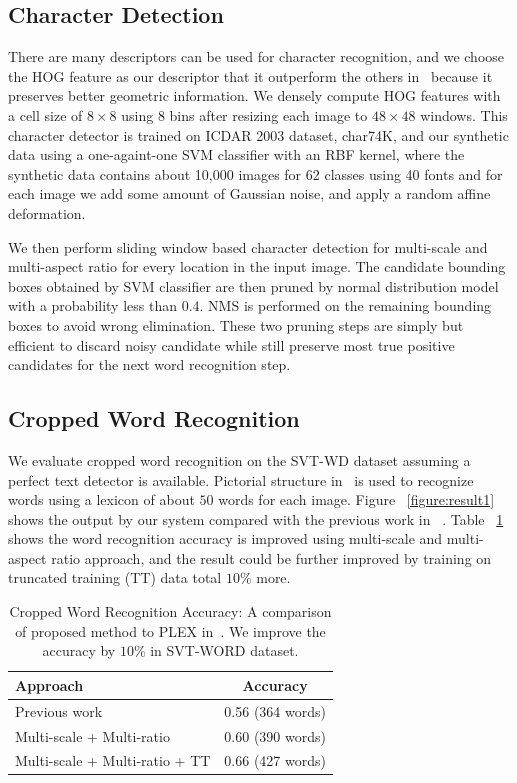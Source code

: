 \documentclass[10pt,twocolumn,letterpaper]{article}
\begin{document}
\subsection{Character Detection}

There are many descriptors can be used for character recognition, and we choose the HOG feature as our descriptor that it outperform the others in~\cite{117} because it preserves better geometric information. We densely compute HOG features with a cell size of $8 \times 8$ using $8$ bins after resizing each image to $48 \times 48$ windows. This character detector is trained on ICDAR 2003 dataset, char74K, and our synthetic data using a one-againt-one SVM classifier with an RBF kernel, where the synthetic data contains about 10,000 images for 62 classes using 40 fonts and for each image we add some amount of Gaussian noise, and apply a random affine deformation.

We then perform sliding window based character detection for multi-scale and multi-aspect ratio for every location in the input image. The candidate bounding boxes obtained by SVM classifier are then pruned by normal distribution model with a probability less than $0.4$. NMS is performed on the remaining bounding boxes to avoid wrong elimination. These two pruning steps are simply but efficient to discard noisy candidate while still preserve most true positive candidates for the next word recognition step.

\subsection{Cropped Word Recognition}

We evaluate cropped word recognition on the SVT-WD dataset assuming a perfect text detector is available. Pictorial structure in~\cite{417} is used to recognize words using a lexicon of about $50$ words for each image. Figure ~\ref{figure:result1} shows the output by our system compared with the previous work in ~\cite{417}. Table ~\ref{table:compare} shows the word recognition accuracy is improved using multi-scale and multi-aspect ratio approach, and the result could be further improved by training on truncated training (TT) data total $10\%$ more.

\begin{table}
\begin{center}
\begin{tabular}{|l|c|}
\hline
Approach & Accuracy \\
\hline\hline
Previous work~\cite{417}  & 0.56 (364 words) \\
Multi-scale + Multi-ratio & 0.60 (390 words)\\
Multi-scale + Multi-ratio + TT & 0.66 (427 words)\\
\hline
\end{tabular}
\end{center}
\caption{Cropped Word Recognition Accuracy: A comparison of proposed method to PLEX in~\cite{417}. We improve the accuracy by $10\%$ in SVT-WORD dataset.}
\label{table:compare}
\end{table}
\end{document}
